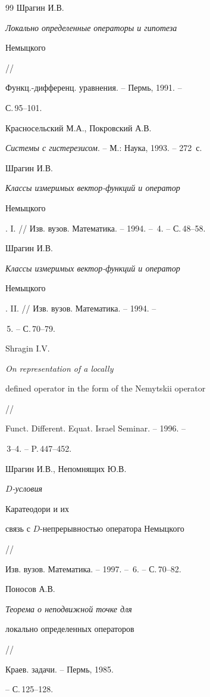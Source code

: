 \begin{thebibliography}{99}
 Шрагин И.В. {\it Локально определенные операторы и гипотеза


Немыцкого} //


Функц.-дифференц. уравнения. -- Пермь, 1991. --


С.\,95--101.





 Красносельский М.А., Покровский А.В.


{\it Системы с гистерезисом}. -- М.: Наука, 1993. -- 272~с.





 Шрагин И.В. {\it Классы измеримых век\-тор-функ\-ций и оператор


Немыцкого}. I. // Изв. вузов. Математика. -- 1994. -- \No\,4. -- С.\,48--58.





 Шрагин И.В. {\it Классы измеримых век\-тор-функ\-ций и оператор


Немыцкого}. II. // Изв. вузов. Математика. -- 1994. --


\No\,5. -- С.\,70--79.





 Shragin I.V. {\it On representation of a locally


defined operator in the form of the Nemytskii operator} //


Funct. Different. Equat. Israel Seminar. -- 1996. --


\No\,3--4. -- P.\,447--452.





 Шрагин И.В., Непомнящих Ю.В. {\it $D$-ус\-ло\-вия


Каратеодори и их


связь с $D$-не\-пре\-рыв\-ностью оператора Немыцкого} //


Изв. вузов. Математика. -- 1997. -- \No\,6. -- С.\,70--82.





 Поносов А.В. {\it Теорема о неподвижной точке для


локально определенных операторов} //


Краев. задачи. -- Пермь, 1985.


-- С.\,125--128.






\end{thebibliography}
